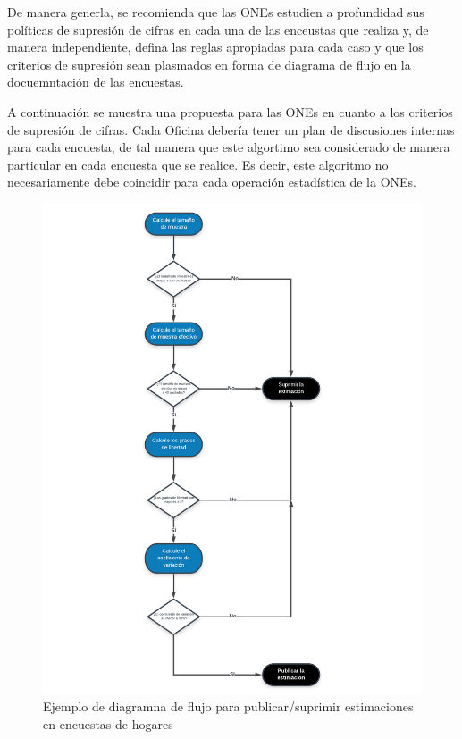 \documentclass[12pt,spanish,]{book}
\begin{document}
De manera generla, se recomienda que las ONEs estudien a profundidad sus políticas de supresión de cifras en cada una de las enceustas que realiza y, de manera independiente, defina las reglas apropiadas para cada caso y que los criterios de supresión sean plasmados en forma de diagrama de flujo en la docuemntación de las encuestas.

A continuación se muestra una propuesta para las ONEs en cuanto a los criterios de supresión de cifras. Cada Oficina debería tener un plan de discusiones internas para cada encuesta, de tal manera que este algortimo sea considerado de manera particular en cada encuesta que se realice. Es decir, este algoritmo no necesariamente debe coincidir para cada operación estadística de la ONEs.

\begin{figure}
\centering
\includegraphics{Pics/14.pdf}
\caption{Ejemplo de diagramna de flujo para publicar/suprimir estimaciones en encuestas de hogares}
\end{figure}
\end{document}
